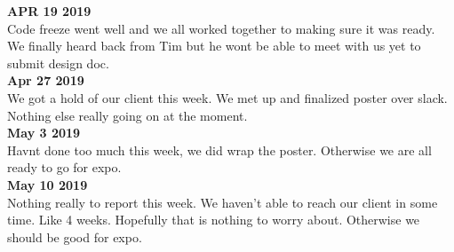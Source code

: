 \textbf{APR 19 2019}\\
Code freeze went well and we all worked together to making sure it was ready.
We finally heard back from Tim but he wont be able to meet with us yet to submit design doc.\\

\textbf{Apr 27 2019}\\
We got a hold of our client this week. We met up and finalized poster over slack. Nothing else really going on at the moment.\\

\textbf{May 3 2019}\\
Havnt done too much this week, we did wrap the poster. Otherwise we are all ready to go for expo.\\

\textbf{May 10 2019}\\
Nothing really to report this week. We haven't able to reach our client in some time. Like 4 weeks. Hopefully that is nothing to worry about. Otherwise we should be good for expo.\\
